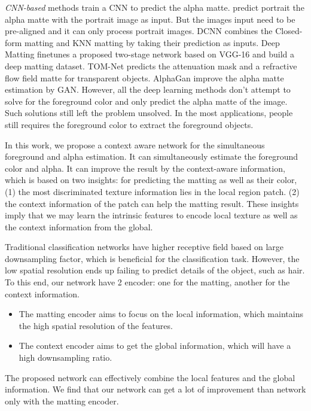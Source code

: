 \documentclass[10pt,twocolumn,letterpaper]{article}
\begin{document}
{\textit{CNN-based} methods \cite{shen2016deep, xu2017deep, cho2016natural, chen2018tom, lutz2018alphagan} train a CNN to predict the alpha matte. \cite{shen2016deep} predict portrait the alpha matte with the portrait image as input. But the images input need to be pre-aligned and it can only process portrait images. DCNN\cite{cho2016natural} combines the Closed-form matting and KNN matting by taking their prediction as inputs. Deep Matting \cite{xu2017deep} finetunes a proposed two-stage network based on VGG-16 and build a deep matting dataset. TOM-Net\cite{chen2018tom} predicts the attenuation mask and a refractive flow field matte for transparent objects. AlphaGan\cite{lutz2018alphagan} improve the alpha matte estimation by GAN. However, all the deep learning methods don't attempt to solve for the foreground color and only predict the alpha matte of the image. Such solutions still left the problem unsolved. In the most applications, people still requires the foreground color to extract the foreground objects.





In this work, we propose a context aware network for the simultaneous foreground and alpha estimation. It can simultaneously estimate the foreground color and alpha. It can improve the result by the context-aware information, which is based on two insights: for predicting the matting as well as their color, (1) the most discriminated texture information lies in the local region patch. (2) the context information of the patch can help the matting result. These insights imply that we may learn the intrinsic features to encode local texture as well as the context information from the global. 

Traditional classification networks \cite{krizhevsky2012imagenet, simonyan2014very, he2016deep, chollet2017xception, mobilenetv22018} have higher receptive field based on large downsampling factor, which is beneficial for the classification task. However, the low spatial resolution ends up failing to predict details of the object, such as hair. To this end, our network have 2 encoder: one for the matting, another for the context information.
\begin{itemize}
    \item The matting encoder aims to focus on the local information, which maintains the high spatial resolution of the features.
    \item The context encoder aims to get the global information, which will have a high downsampling ratio.
\end{itemize}
The proposed network can effectively combine the local features and the global information.  We find that our network can get a lot of improvement than network only with the matting encoder.  

}
\end{document}
